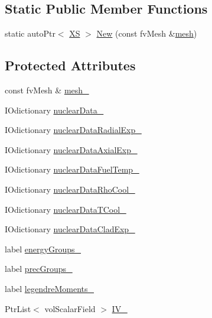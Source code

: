 \subsection*{Static Public Member Functions}
\begin{DoxyCompactItemize}
\item 
static auto\+Ptr$<$ \hyperlink{classFoam_1_1XS}{XS} $>$ \hyperlink{classFoam_1_1XS_a42a2224cfae7af754fbfc469f5a861eb}{New} (const fv\+Mesh \&\hyperlink{createMeshesPostProcess_8H_a8bb1e58291d2d2b653e024a4f4bffe38}{mesh})
\end{DoxyCompactItemize}
\subsection*{Protected Attributes}
\begin{DoxyCompactItemize}
\item 
const fv\+Mesh \& \hyperlink{classFoam_1_1XS_a23edeeeecebcef11921a33dd5d990570}{mesh\+\_\+}
\item 
I\+Odictionary \hyperlink{classFoam_1_1XS_a5f8311a3a430c76dd8ad948460751646}{nuclear\+Data\+\_\+}
\item 
I\+Odictionary \hyperlink{classFoam_1_1XS_a9480d6e0437856b9c8f92ff75bc2b293}{nuclear\+Data\+Radial\+Exp\+\_\+}
\item 
I\+Odictionary \hyperlink{classFoam_1_1XS_a63645f4a1c5df874d88ae896920a8971}{nuclear\+Data\+Axial\+Exp\+\_\+}
\item 
I\+Odictionary \hyperlink{classFoam_1_1XS_a48e05dd8011f2d4305e3bad0f0fe1f0a}{nuclear\+Data\+Fuel\+Temp\+\_\+}
\item 
I\+Odictionary \hyperlink{classFoam_1_1XS_a15c1504755965c53fbbe6a429abc28a8}{nuclear\+Data\+Rho\+Cool\+\_\+}
\item 
I\+Odictionary \hyperlink{classFoam_1_1XS_ae38071e829db93ddf1c47ee3d8df5c4d}{nuclear\+Data\+T\+Cool\+\_\+}
\item 
I\+Odictionary \hyperlink{classFoam_1_1XS_afa518738c6f456b2cec2aaa1ad8ddf43}{nuclear\+Data\+Clad\+Exp\+\_\+}
\item 
label \hyperlink{classFoam_1_1XS_a455b047ba459073908c08fd5e087dc45}{energy\+Groups\+\_\+}
\item 
label \hyperlink{classFoam_1_1XS_acf21654ea27e2240302c291a95738ea2}{prec\+Groups\+\_\+}
\item 
label \hyperlink{classFoam_1_1XS_a3ff89536c8e3ea70e46d35eccdfbfc4a}{legendre\+Moments\+\_\+}
\item 
Ptr\+List$<$ vol\+Scalar\+Field $>$ \hyperlink{classFoam_1_1XS_a931edd829a09bca4fb290036a3971f1d}{I\+V\+\_\+}

\end{DoxyCompactItemize}
